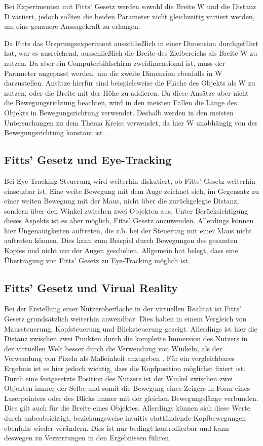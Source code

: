 Bei Experimenten mit Fitts' Gesetz werden sowohl die Breite W und die Distanz D variiert, jedoch sollten die beiden Parameter nicht gleichzeitig variiert werden, um eine genauere Aussagekraft zu erlangen. 

Da Fitts das Ursprungsexperiment ausschließlich in einer Dimension durchgeführt hat, war es ausreichend, ausschließlich die Breite des Zielbereichs als Breite W zu nutzen. Da aber ein Computerbildschirm zweidimensional ist, muss der Parameter angepasst werden, um die zweite Dimension ebenfalls in W darzustellen. Ansätze hierfür sind beispielsweise die Fläche des Objekts als W zu nutzen, oder die Breite mit der Höhe zu addieren. Da diese Ansätze aber nicht die Bewegungsrichtung beachten, wird in den meisten Fällen die Länge des Objekts in Bewegungsrichtung verwendet. Deshalb werden in den meisten Untersuchungen zu dem Thema Kreise verwendet, da hier W unabhängig von der Bewegungsrichtung konstant ist \cite{Soukoreff.2004}. 

\subsection{Fitts' Gesetz und Eye-Tracking}
Bei Eye-Tracking Steuerung wird weiterhin diskutiert, ob Fitts' Gesetz weiterhin einsetzbar ist. Eine weite Bewegung mit dem Auge zeichnet sich, im Gegensatz zu einer weiten Bewegung mit der Maus, nicht über die zurückgelegte Distanz, sondern über den Winkel zwischen zwei Objekten aus. Unter Berücksichtigung dieses Aspekts ist es aber möglich, Fitts' Gesetz anzuwenden. Allerdings können hier Ungenauigkeiten auftreten, die z.b. bei der Steuerung mit einer Maus nicht auftreten können. Dies kann zum Beispiel durch Bewegungen des gesamten Kopfes und nicht nur der Augen geschehen. Allgemein hat \citeauthor{Miniotas.2000} belegt, dass eine Übertragung von Fitts' Gesetz zu Eye-Tracking möglich ist. \cite{Miniotas.2000}

\subsection{Fitts' Gesetz und Virual Reality}
Bei der Erstellung einer Nutzeroberfläche in der virtuellen Realität ist Fitts' Gesetz grundsätzlich weiterhin anwendbar. Dies haben \citeauthor{Hansen.2018} in einem Vergleich von Maussteuerung, Kopfsteuerung und Blicksteuerung gezeigt.\cite{Hansen.2018} Allerdings ist hier die Distanz zwischen zwei Punkten durch die komplette Immersion des Nutzers in der virtuellen Welt besser durch die Verwendung von Winkeln, als der Verwendung von Pixeln als Maßeinheit anzugeben \cite{Hansen.2018}. Für ein vergleichbares Ergebnis ist es hier jedoch wichtig, dass die Kopfposition möglichst fixiert ist. Durch eine festgesetzte Position des Nutzers ist der Winkel zwischen zwei Objekten immer der Selbe und somit die Bewegung eines Zeigers in Form eines Laserpointers oder des Blicks immer mit der gleichen Bewegungslänge verbunden. Dies gilt auch für die Breite eines Objektes. Allerdings können sich diese Werte durch unbeabsichtigt, beziehungsweise intuitiv stattfindende Kopfbewegungen ebenfalls wieder verändern. Dies ist nur bedingt kontrollierbar und kann deswegen zu Verzerrungen in den Ergebnissen führen. 

